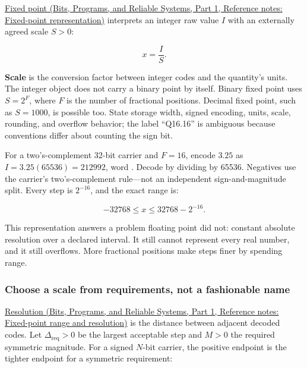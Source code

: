 \href{../01-Bits-Programs-and-Reliable-Systems-P01/main.pdf\#appendix-1d0dbe8924cc}{Fixed point (Bits, Programs, and Reliable Systems, Part 1, Reference notes: Fixed-point representation)} interprets an integer raw value \(I\) with an externally agreed scale \(S>0\):

\[
x=\frac{I}{S}.
\]

\textbf{Scale} is the conversion factor between integer codes and the quantity's units. The integer object does not carry a binary point by itself. Binary fixed point uses \(S=2^F\), where \(F\) is the number of fractional positions. Decimal fixed point, such as \(S=1000\), is possible too. State storage width, signed encoding, units, scale, rounding, and overflow behavior; the label ``Q16.16'' is ambiguous because conventions differ about counting the sign bit.

For a two's-complement 32-bit carrier and \(F=16\), encode \(3.25\) as \(I=3.25(65536)=212992\), word . Decode by dividing by 65536. Negatives use the carrier's two's-complement rule---not an independent sign-and-magnitude split. Every step is \(2^{-16}\), and the exact range is:

\[
-32768\le x\le32768-2^{-16}.
\]

This representation answers a problem floating point did not: constant absolute resolution over a declared interval. It still cannot represent every real number, and it still overflows. More fractional positions make steps finer by spending range.

\subsubsection{Choose a scale from requirements, not a fashionable name}\label{05-engine-i-ch001-choose-a-scale-from-requirements-not-a-fashionable-name}

\hypertarget{05-engine-i-ch001-choose-a-scale-from-requirements-not-a-fashionable-name}{}

\href{../01-Bits-Programs-and-Reliable-Systems-P01/main.pdf\#appendix-ceb4c4a9b5a1}{Resolution (Bits, Programs, and Reliable Systems, Part 1, Reference notes: Fixed-point range and resolution)} is the distance between adjacent decoded codes. Let \(\Delta_{\mathrm{req}}>0\) be the largest acceptable step and \(M>0\) the required symmetric magnitude. For a signed \(N\)-bit carrier, the positive endpoint is the tighter endpoint for a symmetric requirement:

